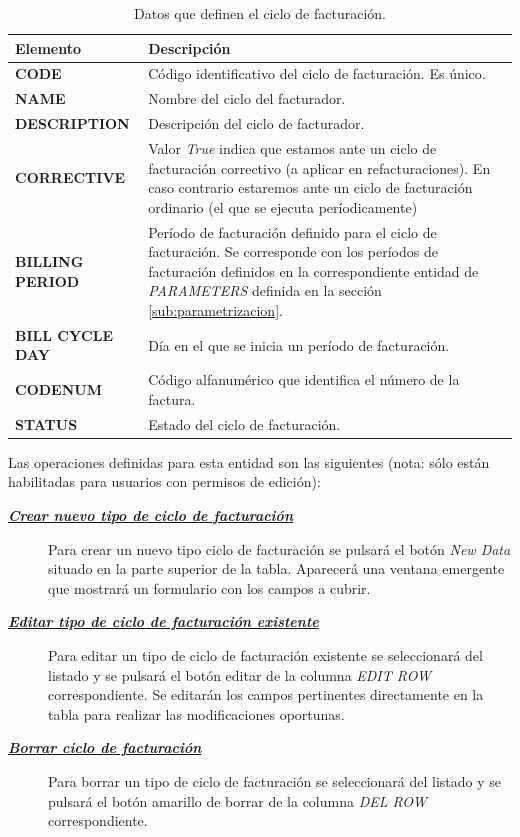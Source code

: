 \begin{table}[H]
  \centering
  \setlength{\leftmargini}{0.4cm}
  \resizebox{14cm}{!} {
  \begin{tabular}{|m{3.5cm} m{11cm}|}
  \rowcolor{udcpink!25}
  \hline
  	\textbf{Elemento} & \textbf{Descripción} \\\hline
	\textbf{CODE} & Código identificativo del ciclo de facturación. Es único.   \\
	\textbf{NAME} & Nombre del ciclo del facturador. \\
	\textbf{DESCRIPTION} & Descripción del ciclo de facturador. \\
	\textbf{CORRECTIVE} & Valor \emph{True} indica que estamos ante un ciclo de facturación correctivo (a aplicar en refacturaciones). En caso contrario estaremos ante un ciclo de facturación ordinario (el que se ejecuta períodicamente)\\
	\textbf{BILLING PERIOD} & Período de facturación definido para el ciclo de facturación. Se corresponde con los períodos de facturación definidos en la correspondiente entidad de \emph{PARAMETERS} definida en la sección \ref{sub:parametrizacion}.   \\
	\textbf{BILL CYCLE DAY} & Día en el que se inicia un período de facturación. \\
	\textbf{CODENUM} & Código alfanumérico que identifica el número de la factura.\\
	\textbf{STATUS} & Estado del ciclo de facturación.
	\\\hline
  \end{tabular}
  } %
  \caption{Datos que definen el ciclo de facturación.}
  \label{tab:ciclo-facturacion}
\end{table}


Las operaciones definidas para esta entidad son las siguientes (nota: sólo están habilitadas para usuarios con permisos de edición):
\begin{description}
  \item[\underline{\textsl{\textbf{Crear nuevo tipo de ciclo de facturación}}}] Para crear un nuevo tipo ciclo de facturación se pulsará el botón \textit{New Data} situado en la parte superior de la tabla. Aparecerá una ventana emergente que mostrará un formulario con los campos a cubrir.

  \item[\underline{\textsl{\textbf{Editar tipo de ciclo de facturación existente}}}] Para editar un tipo de ciclo de facturación existente se seleccionará del listado y se pulsará el botón editar de la columna \textit{EDIT ROW} correspondiente. Se editarán los campos pertinentes directamente en la tabla para realizar las modificaciones oportunas. 

  \item[\underline{\textsl{\textbf{Borrar ciclo de facturación}}}] Para borrar un tipo de ciclo de facturación se seleccionará del listado y se pulsará el botón amarillo de borrar de la columna \textit{DEL ROW} correspondiente.
\end{description}

